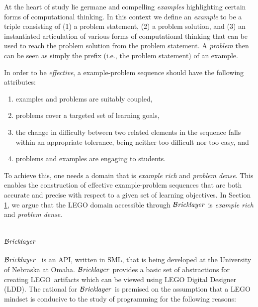\documentclass[submission,copyright,creativecommons]{eptcs}
\newcommand{\bricklayer}{\ensuremath{\mathcal{B}\emph{ricklayer}}}
\begin{document}
At the heart of study lie germane and compelling \emph{examples} highlighting certain forms of computational thinking. In this context we define an \emph{example} to be a triple consisting of (1) a problem statement, (2) a problem solution, and (3) an instantiated articulation of various forms of computational thinking that can be used to reach the problem solution from the problem statement. A \emph{problem} then can be seen as simply the prefix (i.e., the problem statement) of an example.

In order to be \emph{effective}, a example-problem sequence should have the following attributes:

\begin{enumerate}
 \item examples and problems are suitably coupled,
 \item problems cover a targeted set of learning goals,
 \item the change in difficulty between two related elements in the sequence falls within an appropriate tolerance, being neither too difficult nor too easy, and
 \item problems and examples are engaging to students.
\end{enumerate}

To achieve this, one needs a domain that is \emph{example rich} and \emph{problem dense}. This enables the construction of effective example-problem sequences that are both accurate and precise with respect to a given set of learning objectives. In Section \ref{section-bricklayer}, we argue that the LEGO domain accessible through \bricklayer\ is \emph{example rich} and \emph{problem dense}.







\section{\bricklayer}\label{section-bricklayer}
\bricklayer\ \cite{Bricklayer} is an API, written in SML, that is being developed at the University of Nebraska at Omaha. \bricklayer\ provides a basic set of abstractions for creating LEGO\textregistered\ artifacts which can be viewed using LEGO Digital Designer (LDD). The rational for \bricklayer\ is premised on the assumption that a LEGO mindset is conducive to the study of programming for the following reasons:
\end{document}
